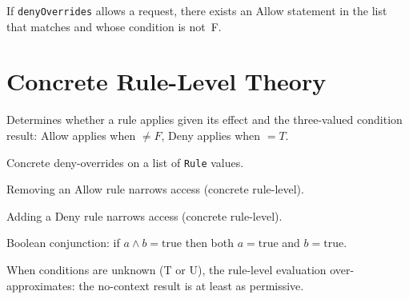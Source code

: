 \begin{theorem}\label{thm:grants_complete_generic}
\leanok
If \texttt{denyOverrides} allows a request, there exists an Allow
statement in the list that matches and whose condition is not~F.
\end{theorem}

\section{Concrete Rule-Level Theory}

\begin{definition}[appliesOf]\label{def:appliesOf}
\leanok
Determines whether a rule applies given its effect and the
three-valued condition result: Allow applies when $\neq F$,
Deny applies when $= T$.
\end{definition}

\begin{definition}[denyOverridesRules]\label{def:denyOverridesRules}
\leanok
Concrete deny-overrides on a list of \texttt{Rule} values.
\end{definition}

\begin{theorem}\label{thm:denyOverrides_remove_allow_narrows}
\leanok
Removing an Allow rule narrows access (concrete rule-level).
\end{theorem}

\begin{theorem}\label{thm:denyOverrides_add_deny_narrows}
\leanok
Adding a Deny rule narrows access (concrete rule-level).
\end{theorem}

\begin{lemma}\label{lem:conj_narrows}
\leanok
Boolean conjunction: if $a \land b = \text{true}$ then both
$a = \text{true}$ and $b = \text{true}$.
\end{lemma}

\begin{theorem}\label{thm:appliesOf_unknown_conservative}
\leanok
When conditions are unknown (T or U), the rule-level evaluation
over-approximates: the no-context result is at least as permissive.
\end{theorem}

